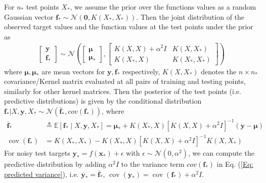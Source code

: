 \documentclass{scrartcl}[2013/05/29]%
\begin{document}
For $n_\ast$ test points $X_\ast$, we assume the prior over the functions values as a random Gaussian vector $\mathbf{f}_\ast \sim \mathcal{N}(\mathbf{0}, K(X_\ast, X_\ast))$.
Then the joint distribution of the observed target values and the function values at the test points under the prior as 
\begin{align}
    \left[\begin{array}{l}\mathbf{y} \\ \mathbf{f}_{*}\end{array}\right] \sim \mathcal{N}\left(
        \left[\begin{array}{cc}
        \bm{\mu}  \\
        \bm{\mu}_\ast
        \end{array}\right],
    \left[\begin{array}{cc}K(X, X)+\alpha^{2} I & K\left(X, X_{*}\right) \\ K\left(X_{*}, X\right) & K\left(X_{*}, X_{*}\right)\end{array}\right]\right)
\end{align}
where
$\bm{\mu}, \bm{\mu}_\ast$ are mean vectors for $\mathbf{y}, \mathbf{f}_{*}$ respectively,
$K(X, X_\ast)$ denotes the $n \times n_\ast$ covariance/Kernel matrix evaluated at all pairs of training and testing points, similarly for other kernel matrices.
Then the posterior of the test points (i.e. predictive distributions) is given by the conditional distribution $\mathbf{f}_\ast | X, \mathbf{y}, X_\ast \sim \mathcal{N}(\bar{\mathbf{f}}_\ast, cov(\mathbf{f}_\ast))$, where
\begin{align}
   \overline{\mathbf{f}}_{*} & \triangleq \mathbb{E}\left[\mathbf{f}_{*} \mid X, \mathbf{y}, X_{*}\right]=
   \bm{\mu}_\ast + K\left(X_{*}, X\right)\left[K(X, X)+\alpha^{2} I\right]^{-1} (\mathbf{y} - \bm{\mu})\\
   \label{Eq: predicted variance}
   \operatorname{cov}\left(\mathbf{f}_{*}\right) &=K\left(X_{*}, X_{*}\right)-K\left(X_{*}, X\right)\left[K(X, X)+\alpha^{2} I\right]^{-1} K\left(X, X_{*}\right) 
\end{align}
For noisy test targets $\mathbf{y}_\ast = f(\mathbf{x}_\ast) + \epsilon$ with $\epsilon \sim \mathcal{N}(0, \alpha^2)$, we can compute the predictive distribution by adding $\alpha^2 I$ to the variance term $cov(\mathbf{f}_\ast)$ in Eq. (\ref{Eq: predicted variance}),
i.e. $\overline{\mathbf{y}}_{*} = \overline{\mathbf{f}}_{*}$, $\operatorname{cov}\left(\mathbf{y}_{*}\right) = \operatorname{cov}\left(\mathbf{f}_{*}\right) + \alpha^2 I$.
\end{document}
